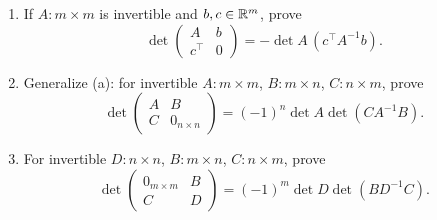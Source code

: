 \begin{problem}\label{ex:05:zero-pivot-block}
\begin{enumerate}
\item If \(A:m\times m\) is invertible and \(b,c\in\mathbb R^m\), prove
\[
\det\begin{pmatrix}A&b\\c^\top&0\end{pmatrix}
=-\det A\,(c^\top A^{-1}b).
\]
\item Generalize (a): for invertible \(A:m\times m\),
\(B:m\times n\), \(C:n\times m\), prove
\[
\det\begin{pmatrix}A&B\\C&0_{n\times n}\end{pmatrix}
=(-1)^n\det A\det(CA^{-1}B).
\]
\item For invertible \(D:n\times n\), \(B:m\times n\), \(C:n\times m\), prove
\[
\det\begin{pmatrix}0_{m\times m}&B\\C&D\end{pmatrix}
=(-1)^m\det D\det(BD^{-1}C).
\]
\end{enumerate}
\end{problem}
